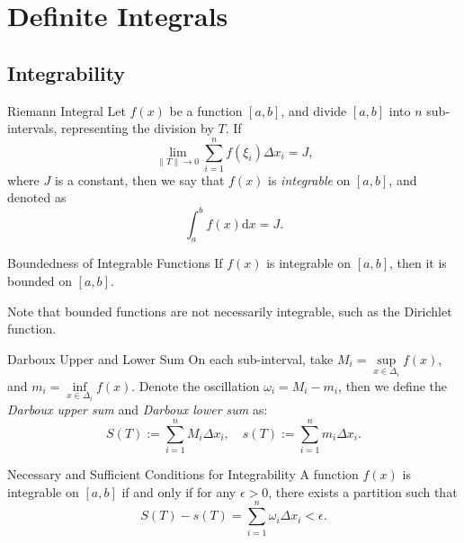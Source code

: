 \begin{solution}
  
\end{solution}

\section{Definite Integrals}

\subsection{Integrability}

\begin{definition}{Riemann Integral}{}
  Let $f(x)$ be a function $[a, b]$, and divide $[a, b]$ into $n$ sub-intervals,
  representing the division by $T$.
  If
  \begin{equation}
    \lim \limits _{\|T\| \rightarrow 0} \sum\limits_{i = 1}^n f(\xi_i) \Delta x_i = J,
  \end{equation}
  where $J$ is a constant, then we say that $f(x)$ is \emph{integrable} on $[a, b]$,
  and denoted as
  \begin{equation}
    \int_a^b f(x) \mathrm{d} x = J.
  \end{equation}
\end{definition}

\begin{proposition}{Boundedness of Integrable Functions}{}
  If $f(x)$ is integrable on $[a, b]$, then it is bounded on $[a, b]$.
\end{proposition}

\begin{note}
  Note that bounded functions are not necessarily integrable, such as the
  Dirichlet function.
\end{note}

\begin{definition}{Darboux Upper and Lower Sum}{}
  On each sub-interval, take $M_i = \sup \limits_{x \in \Delta_i} f(x)$,
  and $m_i = \inf \limits_{x \in \Delta_i} f(x)$.
  Denote the oscillation $\omega_i = M_i - m_i$,
  then we define the \emph{Darboux upper sum} and \emph{Darboux lower sum} as:
  \begin{equation}
    S(T) := \sum\limits_{i = 1}^n M_i \Delta x_i, \quad
    s(T) := \sum\limits_{i = 1}^n m_i \Delta x_i.
  \end{equation}
\end{definition}

\begin{proposition}{Necessary and Sufficient Conditions for Integrability}{}
  A function $f(x)$ is integrable on $[a, b]$ if and only if
  for any $\epsilon > 0$, there exists a partition such that
  \begin{equation}
    S(T) - s(T) = \sum\limits_{i = 1}^n \omega_i \Delta x_i < \epsilon.
  \end{equation}
\end{proposition}


